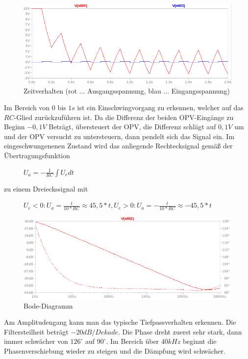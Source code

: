 \documentclass[12pt,a4paper,titlepage]{article}
\begin{document}
\begin{figure}[H]
  \centering
  \includegraphics[width=150mm]{integrierer_transient.png}
  \caption{Zeitverhalten (rot $\hdots$ Ausgangsspannung, blau $\hdots$ Eingangsspannung)}
\end{figure}
Im Bereich von $0$ bis $1s$ ist ein Einschwingvorgang zu erkennen, welcher auf das $RC$-Glied zur\"uckzuf\"uhren ist. Da die Differenz der beiden OPV-Eing\"ange zu Beginn $-0,1V$ Betr\"agt, \"ubersteuert der OPV, die Differenz schl\"agt auf $0,1V$ um und der OPV versucht zu untersteuern, dann pendelt sich das Signal ein. Im eingeschwungenenen Zustand wird das anliegende Rechtecksignal gem\"aß der \"Ubertragungsfunktion

\begin{figure}[H]
  \centering
  $U_a = -\frac{1}{RC}\int U_e dt$
\end{figure}

\noindent zu einem Dreieckssignal mit

\begin{figure}[H]
  \centering
  $U_e<0: U_a = \frac{t}{10*RC} \approx 45,5*t, U_e>0: U_a = -\frac{t}{10*RC} \approx -45,5*t$
\end{figure}


\begin{figure}[H]
  \centering
  \includegraphics[width=150mm]{integrierer_bode.png}
  \caption{Bode-Diagramm}
\end{figure}

\noindent Am Amplitudengang kann man das typische Tiefpassverhalten erkennen. Die Filtersteilheit betr\"agt $-20dB/Dekade$. Die Phase dreht zuerst sehr stark, dann immer schw\"acher von $126^{\circ}$ auf $90^{\circ}$. Im Bereich \"uber $40kHz$ beginnt die Phasenverschiebung wieder zu steigen und die D\"ampfung wird schw\"acher.\\
\end{document}
